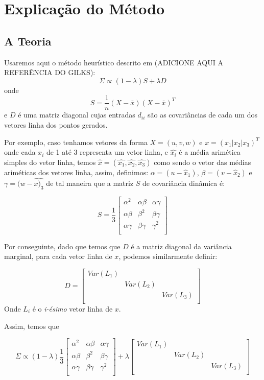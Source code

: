 \documentclass[12pt, a4paper]{article}
\begin{document}
\section{Explicação do Método}

\subsection{A Teoria}
Usaremos aqui o método heurístico descrito em (ADICIONE AQUI A REFERÊNCIA DO GILKS): $$\Sigma \propto (1-\lambda)S + \lambda D $$ onde $$S = \frac{1}{n}(X-\bar{x})(X-\bar{x})^T$$ e $D$ é uma matriz diagonal cujas entradas $d_{ii}$ são as covariâncias de cada um dos vetores linha dos pontos gerados.

Por exemplo, caso tenhamos vetores da forma $X = (u, v, w)$ e $x = (x_1 | x_2 |  x_3)^T$ onde cada $x_i$ de 1 até 3 representa um vetor linha, e $\hat{x_i}$ é a média arimética simples do vetor linha, temos $\hat{x} = (\hat{x_1}, \hat{x_2}, \hat{x_3})$ como sendo o vetor das médias ariméticas dos vetores linha, assim, definimos: $\alpha = (u - \hat{x}_1)$, $\beta = (v - \hat{x}_2)$ e $\gamma = (w - \hat{x)_3}$ de tal maneira que a matriz $S$ de covariância dinâmica é: 

$$S =  \frac{1}{3}
\begin{bmatrix}
\alpha^2 & \alpha \beta & \alpha \gamma \\
\alpha \beta &  \beta^2 & \beta \gamma \\
\alpha \gamma & \beta \gamma & \gamma ^2 \\
\end{bmatrix}
$$

Por conseguinte, dado que temos que $D$ é a matriz diagonal da variância marginal, para cada vetor linha de $x$, podemos similarmente definir:

$$D = 
\begin{bmatrix}
Var(L_1) & & \\
& Var(L_2) & \\
& & Var(L_3) \\
\end{bmatrix}
$$
Onde $L_i$ é o \textit{i-ésimo} vetor linha de $x$. 

Assim, temos que 

$$
\Sigma \propto  (1-\lambda)\frac{1}{3}
\begin{bmatrix}
\alpha^2 & \alpha \beta & \alpha \gamma \\
\alpha \beta &  \beta^2 & \beta \gamma \\
\alpha \gamma & \beta \gamma & \gamma ^2 \\
\end{bmatrix}
+ \lambda
\begin{bmatrix}
Var(L_1) & & \\
& Var(L_2) & \\
& & Var(L_3) \\
\end{bmatrix}
$$
\end{document}
